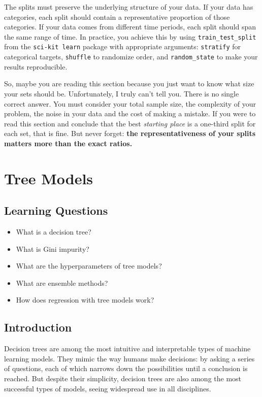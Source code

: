 The splits must preserve the underlying structure of your data. If your data has categories, each split should contain a representative proportion of those categories. If your data comes from different time periods, each split should span the same range of time. In practice, you achieve this by using \verb|train_test_split| from the \texttt{sci-kit learn} package with appropriate arguments: \verb|stratify| for categorical targets, \verb|shuffle| to randomize order, and \verb|random_state| to make your results reproducible.

So, maybe you are reading this section because you just want to know what size your sets should be. Unfortunately, I truly can't tell you. There is no single correct answer. You must consider your total sample size, the complexity of your problem, the noise in your data and the cost of making a mistake. If you were to read this section and conclude that the best \textit{starting place} is a one-third split for each set, that is fine. But never forget: \textbf{the representativeness of your splits matters more than the exact ratios.}

\clearpage
\section{Tree Models}
\subsection*{Learning Questions}
\begin{itemize}
    \item What is a decision tree?
    \item What is Gini impurity?
    \item What are the hyperparameters of tree models?
    \item What are ensemble methods?
    \item How does regression with tree models work?
\end{itemize}

\subsection*{Introduction}
Decision trees are among the most intuitive and interpretable types of machine learning models. They mimic the way humans make decisions: by asking a series of questions, each of which narrows down the possibilities until a conclusion is reached. But despite their simplicity, decision trees are also among the most successful types of models, seeing widespread use in all disciplines.

